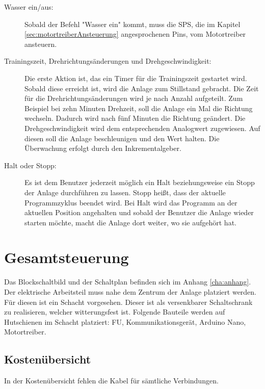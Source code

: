\begin{description}
\item[Wasser ein/aus:]
Sobald der Befehl "{}Wasser ein"{} kommt, muss die SPS, die im Kapitel \ref{sec:motortreiberAnsteuerung} angesprochenen Pins, vom Motortreiber ansteuern.

\item[Trainingszeit, Drehrichtungsänderungen und Drehgeschwindigkeit:]
Die erste Aktion ist, das ein Timer für die Trainingszeit gestartet wird. Sobald diese erreicht ist, wird die Anlage zum Stillstand gebracht. Die Zeit für die Drehrichtungsänderungen wird je nach Anzahl aufgeteilt. Zum Beispiel bei zehn Minuten Drehzeit, soll die Anlage ein Mal die Richtung wechseln. Dadurch wird nach fünf Minuten die Richtung geändert. Die Drehgeschwindigkeit wird dem entsprechenden Analogwert zugewiesen. Auf diesen soll die Anlage beschleunigen und den Wert halten. Die Überwachung erfolgt durch den Inkrementalgeber. 

\item[Halt oder Stopp:]
Es ist dem Benutzer jederzeit möglich ein Halt beziehungsweise ein Stopp der Anlage durchführen zu lassen. Stopp heißt, dass der aktuelle Programmzyklus beendet wird. Bei Halt wird das Programm an der aktuellen Position angehalten und sobald der Benutzer die Anlage wieder starten möchte, macht die Anlage dort weiter, wo sie aufgehört hat. 

\end{description}

\newpage

\section{Gesamtsteuerung}
\label{sec:gesamtsteuerung}

Das Blockschaltbild und der Schaltplan befinden sich im Anhang \ref{cha:anhang}.
Der elektrische Arbeitsteil muss nahe dem Zentrum der Anlage platziert werden. Für diesen ist ein Schacht vorgesehen. Dieser ist als versenkbarer Schaltschrank zu realisieren, welcher witterungsfest ist. Folgende Bauteile werden auf Hutschienen im Schacht platziert: \ac{FU}, Kommunikationsgerät, Arduino Nano, Motortreiber.

\subsection{Kostenübersicht}
\label{sec:kostenuebersicht}

In der Kostenübersicht fehlen die Kabel für sämtliche Verbindungen.\\

